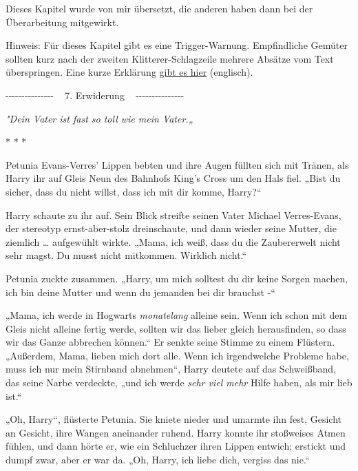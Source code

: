 

\hypertarget{erwiderung}{%

Dieses Kapitel wurde von mir übersetzt, die anderen haben dann bei der Überarbeitung mitgewirkt.

Hinweis: Für dieses Kapitel gibt es eine Trigger-Warnung. Empfindliche Gemüter sollten kurz nach der zweiten Klitterer-Schlagzeile mehrere Absätze vom Text überspringen. Eine kurze Erklärung \href{http://wiki.\%20lesswrong.\%20com/wiki/Methods_Of_Rationality_\%28fanfiction\%29/Nonconsent“\%20target=}{gibt es hier} (englisch).

-\/-\/-\/-\/-\/-\/-\/-\/-\/-\/-\/-\/-\/-\/- ~ 7. Erwiderung ~ -\/-\/-\/-\/-\/-\/-\/-\/-\/-\/-\/-\/-\/-\/-

\emph{"Dein Vater ist fast so toll wie mein Vater.„}

* * *

Petunia Evans-Verres' Lippen bebten und ihre Augen füllten sich mit Tränen, als Harry ihr auf Gleis Neun des Bahnhofs King's Cross um den Hals fiel. „Bist du sicher, dass du nicht willst, dass ich mit dir komme, Harry?“

Harry schaute zu ihr auf. Sein Blick streifte seinen Vater Michael Verres-Evans, der stereotyp ernst-aber-stolz dreinschaute, und dann wieder seine Mutter, die ziemlich … aufgewühlt wirkte. „Mama, ich weiß, dass du die Zaubererwelt nicht sehr magst. Du musst nicht mitkommen. Wirklich nicht.“

Petunia zuckte zusammen. „Harry, um mich solltest du dir keine Sorgen machen, ich bin deine Mutter und wenn du jemanden bei dir brauchst -“

„Mama, ich werde in Hogwarts \emph{monatelang} alleine sein. Wenn ich schon mit dem Gleis nicht alleine fertig werde, sollten wir das lieber gleich herausfinden, so dass wir das Ganze abbrechen können.“ Er senkte seine Stimme zu einem Flüstern. „Außerdem, Mama, lieben mich dort alle. Wenn ich irgendwelche Probleme habe, muss ich nur mein Stirnband abnehmen“, Harry deutete auf das Schweißband, das seine Narbe verdeckte, „und ich werde \emph{sehr viel mehr} Hilfe haben, als mir lieb ist.“

„Oh, Harry“, flüsterte Petunia. Sie kniete nieder und umarmte ihn fest, Gesicht an Gesicht, ihre Wangen aneinander ruhend. Harry konnte ihr stoßweises Atmen fühlen, und dann hörte er, wie ein Schluchzer ihren Lippen entwich; erstickt und dumpf zwar, aber er war da. „Oh, Harry, ich liebe dich, vergiss das nie.“

}
